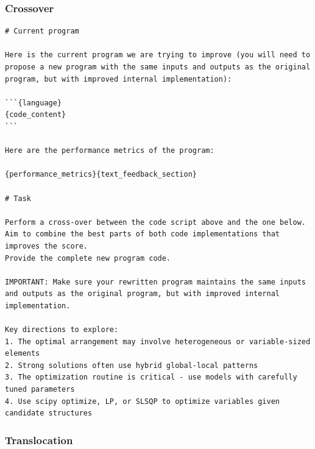 \subsubsection{Crossover}
\label{app:prompts:crossover}


\begin{ttcolorbox}
\begin{lstlisting}[style=prompt]
# Current program

Here is the current program we are trying to improve (you will need to propose a new program with the same inputs and outputs as the original program, but with improved internal implementation):

```{language}
{code_content}
```

Here are the performance metrics of the program:

{performance_metrics}{text_feedback_section}

# Task

Perform a cross-over between the code script above and the one below. Aim to combine the best parts of both code implementations that improves the score.
Provide the complete new program code.

IMPORTANT: Make sure your rewritten program maintains the same inputs and outputs as the original program, but with improved internal implementation.

Key directions to explore:
1. The optimal arrangement may involve heterogeneous or variable-sized elements
2. Strong solutions often use hybrid global-local patterns
3. The optimization routine is critical - use models with carefully tuned parameters
4. Use scipy optimize, LP, or SLSQP to optimize variables given candidate structures
\end{lstlisting}
\end{ttcolorbox}


\subsubsection{Translocation}
\label{app:prompts:translocation}

